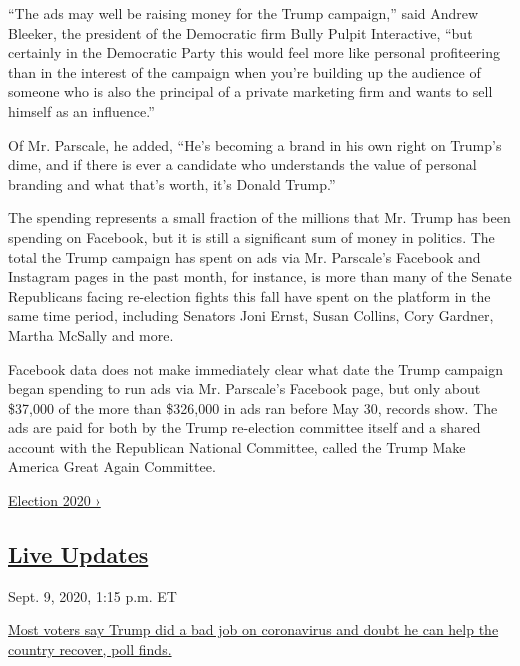 ``The ads may well be raising money for the Trump campaign,'' said
Andrew Bleeker, the president of the Democratic firm Bully Pulpit
Interactive, ``but certainly in the Democratic Party this would feel
more like personal profiteering than in the interest of the campaign
when you're building up the audience of someone who is also the
principal of a private marketing firm and wants to sell himself as an
influence.''

Of Mr. Parscale, he added, ``He's becoming a brand in his own right on
Trump's dime, and if there is ever a candidate who understands the value
of personal branding and what that's worth, it's Donald Trump.''

The spending represents a small fraction of the millions that Mr. Trump
has been spending on Facebook, but it is still a significant sum of
money in politics. The total the Trump campaign has spent on ads via Mr.
Parscale's Facebook and Instagram pages in the past month, for instance,
is more than many of the Senate Republicans facing re-election fights
this fall have spent on the platform in the same time period, including
Senators Joni Ernst, Susan Collins, Cory Gardner, Martha McSally and
more.

Facebook data does not make immediately clear what date the Trump
campaign began spending to run ads via Mr. Parscale's Facebook page, but
only about \$37,000 of the more than \$326,000 in ads ran before May 30,
records show. The ads are paid for both by the Trump re-election
committee itself and a shared account with the Republican National
Committee, called the Trump Make America Great Again Committee.

\href{https://www.nytimes3xbfgragh.onion/news-event/2020-election}{Election
2020 ›}

\hypertarget{live-updates}{%
\subsection{\texorpdfstring{\href{https://www.nytimes3xbfgragh.onion/live/2020/09/09/us/trump-vs-biden}{Live
Updates}}{Live Updates}}\label{live-updates}}

\href{https://www.nytimes3xbfgragh.onion/live/2020/09/09/us/trump-vs-biden\#most-voters-say-trump-did-a-bad-job-on-coronavirus-and-doubt-he-can-help-the-country-recover-poll-finds}{}

Sept. 9, 2020, 1:15 p.m. ET

\href{https://www.nytimes3xbfgragh.onion/live/2020/09/09/us/trump-vs-biden\#most-voters-say-trump-did-a-bad-job-on-coronavirus-and-doubt-he-can-help-the-country-recover-poll-finds}{Most
voters say Trump did a bad job on coronavirus and doubt he can help the
country recover, poll
finds.}\href{https://www.nytimes3xbfgragh.onion/live/2020/09/09/us/trump-vs-biden\#the-nih-director-knocks-down-trumps-prediction-that-a-virus-vaccine-will-be-approved-by-election-day}{}


